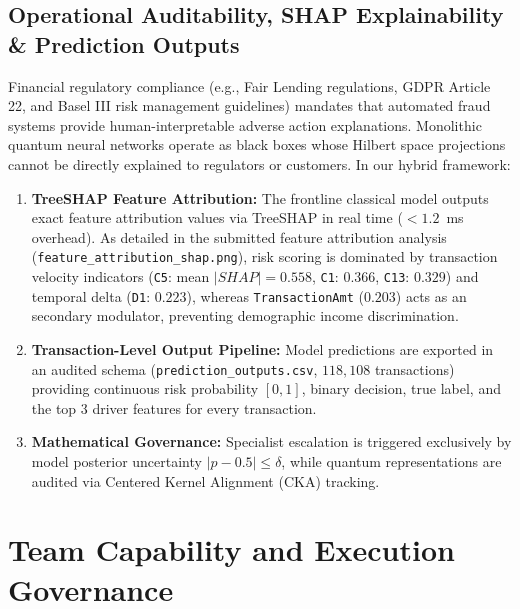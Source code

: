 \documentclass[10pt,a4paper]{article}
\begin{document}
\subsection{Operational Auditability, SHAP Explainability \& Prediction Outputs}
Financial regulatory compliance (e.g., Fair Lending regulations, GDPR Article 22, and Basel III risk management guidelines) mandates that automated fraud systems provide human-interpretable adverse action explanations. Monolithic quantum neural networks operate as black boxes whose Hilbert space projections cannot be directly explained to regulators or customers. 
In our hybrid framework:
\begin{enumerate}[leftmargin=*,itemsep=0.4pt,topsep=1pt]
\item \textbf{TreeSHAP Feature Attribution:} The frontline classical model outputs exact feature attribution values via TreeSHAP in real time ($<1.2$~ms overhead). As detailed in the submitted feature attribution analysis (\texttt{feature\_attribution\_shap.png}), risk scoring is dominated by transaction velocity indicators (\texttt{C5}: mean $|SHAP|=0.558$, \texttt{C1}: $0.366$, \texttt{C13}: $0.329$) and temporal delta (\texttt{D1}: $0.223$), whereas \texttt{TransactionAmt} ($0.203$) acts as an secondary modulator, preventing demographic income discrimination.
\item \textbf{Transaction-Level Output Pipeline:} Model predictions are exported in an audited schema (\texttt{prediction\_outputs.csv}, $118,108$ transactions) providing continuous risk probability $[0, 1]$, binary decision, true label, and the top 3 driver features for every transaction.
\item \textbf{Mathematical Governance:} Specialist escalation is triggered exclusively by model posterior uncertainty $|p - 0.5| \le \delta$, while quantum representations are audited via Centered Kernel Alignment (CKA) tracking.
\end{enumerate}

\clearpage


\section{Team Capability and Execution Governance}
\end{document}
